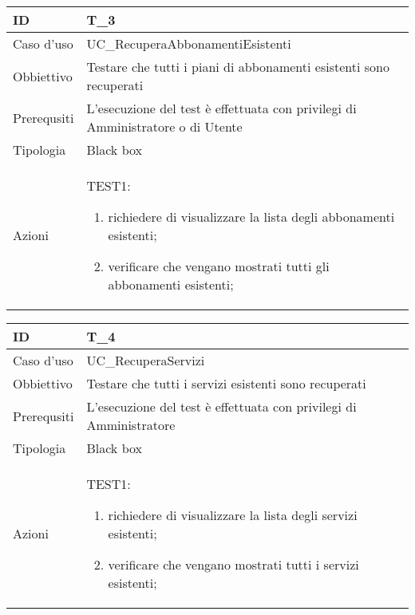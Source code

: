 \begin{table}[hb]
    \centering
    \begin{tabular}{ |p{2cm}|p{10cm}|  }
        \hline
        ID          & T\_3                                                                           \\\hline
        Caso d'uso  & UC\_RecuperaAbbonamentiEsistenti                                               \\\hline
        Obbiettivo  & Testare che tutti i piani di abbonamenti esistenti sono recuperati             \\\hline
        Prerequsiti & L'esecuzione del test è effettuata con privilegi di Amministratore o di Utente \\\hline
        Tipologia   & Black box                                                                      \\\hline
        Azioni      &
        TEST1:
        \begin{enumerate}[nosep, topsep=0pt]
            \item richiedere di visualizzare la lista degli abbonamenti esistenti;
            \item verificare che vengano mostrati tutti gli abbonamenti esistenti;
        \end{enumerate}
        \\\hline
    \end{tabular}
\end{table}

\begin{table}[hb]
    \centering
    \begin{tabular}{ |p{2cm}|p{10cm}|  }
        \hline
        ID          & T\_4                                                               \\\hline
        Caso d'uso  & UC\_RecuperaServizi                                                \\\hline
        Obbiettivo  & Testare che tutti i servizi esistenti sono recuperati              \\\hline
        Prerequsiti & L'esecuzione del test è effettuata con privilegi di Amministratore \\\hline
        Tipologia   & Black box                                                          \\\hline
        Azioni      &
        TEST1:
        \begin{enumerate}[nosep, topsep=0pt]
            \item richiedere di visualizzare la lista degli servizi esistenti;
            \item verificare che vengano mostrati tutti i servizi esistenti;
        \end{enumerate}
        \\\hline
    \end{tabular}
\end{table}


